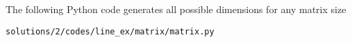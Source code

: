 The  following Python code generates all possible dimensions for any matrix size
\begin{lstlisting}
solutions/2/codes/line_ex/matrix/matrix.py
\end{lstlisting}



